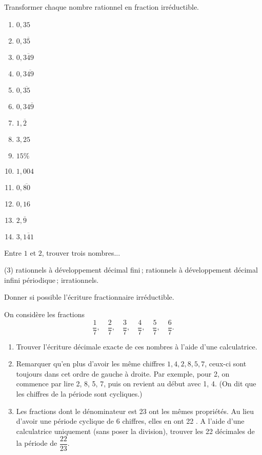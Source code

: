\documentclass[a4paper,12pt]{report}
\begin{document}
\begin{exo}
Transformer chaque nombre rationnel en fraction irréductible.
\begin{multicols}{5}{
\begin{enumerate}
\item $0,35$ 
\item $0,3 \overline{5}$
\item $0, \overline{349}$
\item $0,3 \overline{49}$
\item $0, \overline{35}$
\item $0,34 \overline{9}$
\item $1, \overline{2}$ 
\item $3,25$
\item $15 \%$
\item $1,004$ 
\item $0, \overline{80}$
\item $0,16$
\item $2, \overline{9}$
\item $3, \overline{141}$
\end{enumerate}	
}\end{multicols}
\end{exo}
\begin{exo}
Entre $1$ et $2$, trouver trois nombres...
\begin{center}
	\begin{tasks}(3)
\task rationnels à développement décimal fini\,;
\task rationnels à développement décimal infini périodique\,;
\task irrationnels.
	\end{tasks}
\end{center}
Donner si possible l'écriture fractionnaire irréductible.
\end{exo}

\begin{exo}
On considère les fractions 
\[\dfrac{1}{7}, \quad \dfrac{2}{7}, \quad \dfrac{3}{7}, \quad \dfrac{4}{7}, \quad \dfrac{5}{7}, \quad \dfrac{6}{7}.\]
\begin{enumerate}
\item Trouver l'écriture décimale exacte de ces nombres à l'aide d'une calculatrice.
\item Remarquer qu'en plus d'avoir les même chiffres $1,4,2,8,5,7$, ceux-ci sont toujours dans cet ordre de gauche à droite. Par exemple, pour 2, on commence par lire 2, 8, 5, 7, puis on revient au début avec 1, 4. (On dit que les chiffres de la période sont cycliques.)
\item Les fractions dont le dénominateur est 23 ont les mêmes propriétés. Au lieu d'avoir une période cyclique de 6 chiffres, elles en ont 22 .
A l'aide d'une calculatrice uniquement (sans poser la division), trouver les 22 décimales de la période de $\dfrac{22}{23}$.
\end{enumerate}
\end{exo}
\end{document}
